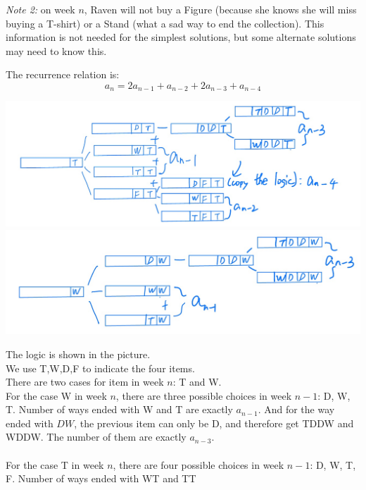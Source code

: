 \documentclass[12pt]{exam}
\begin{document}
\textit{Note 2:} on week $n$, Raven will not buy a Figure (because she knows she will miss buying a T-shirt) or a Stand (what a sad way to end the collection).  This information is not needed for the simplest solutions, but some alternate solutions may need to know this.

\begin{solution}
    \begin{qparts}
        \item 
        The recurrence relation is:\\
        $$
        a_n = 2a_{n-1} + a_{n-2} + 2a_{n-3} + a_{n-4}
        $$
        \begin{center}
            \includegraphics[scale = 0.3]{461697142928_.pic.jpg}\\
            \includegraphics[scale = 0.3]{471697142928_.pic.jpg}\\
        \end{center}
        The logic is shown in the picture.\\
        We use T,W,D,F to indicate the four items.\\
        There are two cases for item in week $n$: T and W.\\
        For the case W in week $n$, there are three possible choices in week $n-1$: D, W, T.
        Number of ways ended with W and T are exactly $a_{n-1}$. And for the way ended with $DW$, the previous
        item can only be D, and therefore get TDDW and WDDW. The number of them are exactly $a_{n-3}$. \\
        \\
        For the case T in week $n$, there are four possible choices in week $n-1$: D, W, T, F. Number of ways ended with WT and TT 

\end{qparts}
\end{solution}
\end{document}
